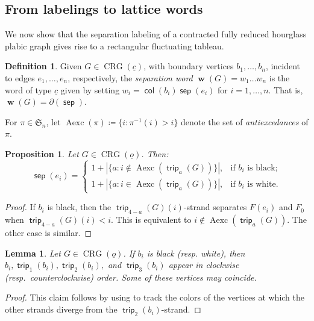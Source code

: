 \documentclass{amsart}
\newtheorem{lemma}[theorem]{Lemma}
\newtheorem{proposition}[theorem]{Proposition}
\theoremstyle{definition}
\newtheorem{definition}[theorem]{Definition}
\theoremstyle{remark}
\numberwithin{equation}{section}
\DeclareMathOperator{\trip}{\mathsf{trip}}
\DeclareMathOperator{\col}{\mathsf{col}}
\DeclareMathOperator{\bw}{\mathbf{w}}
\DeclareMathOperator{\aexc}{\mathrm{Aexc}}
\DeclareMathOperator{\sep}{\mathsf{sep}}
\DeclareMathOperator{\crg}{CRG}
\begin{document}
\subsection{From labelings to lattice words} We now show that the separation labeling of a contracted fully reduced hourglass plabic graph gives rise to a rectangular fluctuating tableau.

\begin{definition}
\label{def:boundary-word}
Given $G \in \crg(\underline{c})$, with boundary vertices $b_1,\ldots,b_n$, incident to edges $e_1,\ldots,e_n$, respectively, the \emph{separation word} $\bw(G)=w_1 \ldots w_n$ is the word of type $\underline{c}$ given by setting $w_i=\col(b_i)\sep(e_i)$ for $i=1,\ldots,n$. That is, $\bw(G)=\partial(\sep)$.
\end{definition}

For $\pi \in \mathfrak{S}_n$, let $\aexc(\pi)\coloneqq \{i : \pi^{-1}(i)>i\}$ denote the set of \emph{antiexcedances} of $\pi$. 

\begin{proposition}
\label{prop:sep-boundary-label-from-trips}
Let $G \in \crg(\underline{o})$. Then:
\[
\sep(e_i) = \begin{cases} 1+\left| \{ a : i \not \in \aexc(\trip_a(G)) \} \right|, &\text{if $b_i$ is black;} \\ 1+\left| \{ a : i \in \aexc(\trip_a(G)) \} \right|, &\text{if $b_i$ is white.} \end{cases}
\]
\end{proposition}
\begin{proof}
If $b_i$ is black, then the $\trip_{4-a}(G)(i)$-strand separates $F(e_i)$ and $F_0$ when $\trip_{4-a}(G)(i)<i$. This is equivalent to $i \not \in \aexc(\trip_{a}(G))$. The other case is similar.
\end{proof}

\begin{lemma}
\label{lem:trip1-2-3-layout}
Let $G \in \crg(\underline{o})$. If $b_i$ is black (resp. white), then $b_i, \trip_1(b_i), \trip_2(b_i),$ and $\trip_3(b_i)$ appear in clockwise (resp.\ counterclockwise) order. Some of these vertices may coincide.
\end{lemma}
\begin{proof}
This claim follows by using  to track the colors of the vertices at which the other strands diverge from the $\trip_2(b_i)$-strand.
\end{proof}
\end{document}
